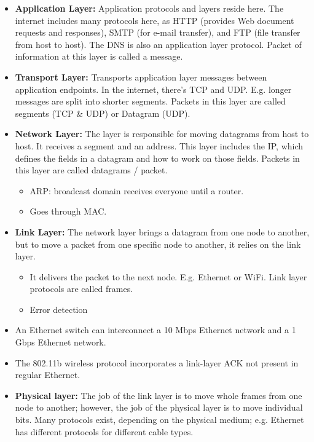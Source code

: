 \documentclass{article}
\begin{document}
\begin{itemize}
    \item \textbf{Application Layer:} Application protocols and layers reside here. The internet includes many protocols here, as HTTP (provides Web document requests and responses), SMTP (for e-mail transfer), and FTP (file transfer from host to host). The DNS is also an application layer protocol. Packet of information at this layer is called a message.
    \item \textbf{Transport Layer:} Transports application layer messages between application endpoints. In the internet, there’s TCP and UDP. E.g. longer messages are split into shorter segments. Packets in this layer are called segments (TCP \& UDP) or Datagram (UDP).
    \item \textbf{Network Layer:} The layer is responsible for moving datagrams from host to host. It receives a segment and an address. This layer includes the IP, which defines the fields in a datagram and how to work on those fields. Packets in this layer are called datagrams / packet.
    \begin{itemize}
        \item ARP: broadcast domain receives everyone until a router.
        \item Goes through MAC.
    \end{itemize}
    \item \textbf{Link Layer:} The network layer brings a datagram from one node to another, but to move a packet from one specific node to another, it relies on the link layer.
    \begin{itemize}
        \item It delivers the packet to the next node. E.g. Ethernet or WiFi. Link layer protocols are called frames.
        \item Error detection
    \end{itemize}
    \item An Ethernet switch can interconnect a 10 Mbps Ethernet network and a 1 Gbps Ethernet network.
    \item The 802.11b wireless protocol incorporates a link-layer ACK not present in regular Ethernet.
    \item \textbf{Physical layer:} The job of the link layer is to move whole frames from one node to another; however, the job of the physical layer is to move individual bits. Many protocols exist, depending on the physical medium; e.g. Ethernet has different protocols for different cable types.
\end{itemize}
\end{document}
